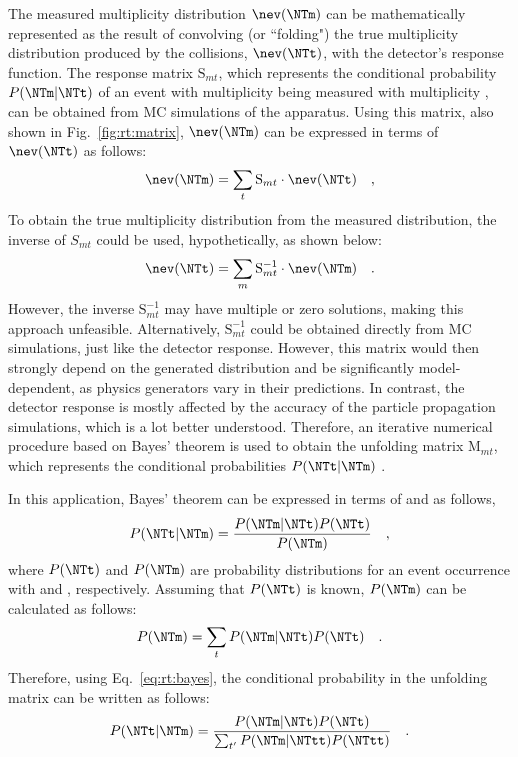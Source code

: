The measured multiplicity distribution $\nev(\NTm)$ can be mathematically represented as the result of convolving (or ``folding") the true multiplicity distribution produced by the collisions, $\nev(\NTt)$, with the detector's response function. The response matrix $\mathrm{S}_{mt}$, which represents the conditional probability $P(\NTm | \NTt)$ of an event with multiplicity \NTt being measured with multiplicity \NTm, can be obtained from MC simulations of the apparatus. Using this matrix, also shown in Fig.~\ref{fig:rt:matrix}, $\nev(\NTm)$ can be expressed in terms of $\nev(\NTt)$ as follows:
\begin{align}
\nev(\NTm) = \sum_t \mathrm{S}_{mt} \cdot \nev(\NTt) \quad ,
\end{align}
To obtain the true multiplicity distribution from the measured distribution, the inverse of $S_{mt}$ could be used, hypothetically, as shown below:
\begin{align}
\nev ( \NTt ) = \sum_m \mathrm{S}_{mt}^{-1} \cdot \nev ( \NTm ) \quad .
\end{align}
However, the inverse $\mathrm{S}_{mt}^{-1}$ may have multiple or zero solutions, making this approach unfeasible. Alternatively, $\mathrm{S}_{mt}^{-1}$ could be obtained directly from MC simulations, just like the detector response. However, this matrix would then strongly depend on the generated \NTt distribution and be significantly model-dependent, as physics generators vary in their \NTt predictions. In contrast, the detector response is mostly affected by the accuracy of the particle propagation simulations, which is a lot better understood. Therefore, an iterative numerical procedure based on Bayes' theorem is used to obtain the unfolding matrix $\mathrm{M}_{mt}$, which represents the conditional probabilities $P(\NTt | \NTm)$ \cite{dagostiniMultidimensionalUnfoldingMethod1995}.

In this application, Bayes' theorem can be expressed in terms of \NTm and \NTt as follows,
\begin{align}
\label{eq:rt:bayes}
P(\NTt | \NTm) = \dfrac{P(\NTm | \NTt)P(\NTt)}{P(\NTm)} \quad ,
\end{align}
where $P(\NTt)$ and $P(\NTm)$ are probability distributions for an event occurrence with \NTt and \NTm, respectively. Assuming that $P(\NTt)$ is known, $P(\NTm)$ can be calculated as follows:
\begin{align}
P(\NTm) = \sum_t P(\NTm | \NTt) P(\NTt) \quad .
\end{align}
Therefore, using Eq.~\ref{eq:rt:bayes}, the conditional probability in the unfolding matrix can be written as follows:
\begin{align}
P(\NTt | \NTm) = \dfrac{P(\NTm | \NTt)P(\NTt)}{\sum_{t'} P(\NTm | \NTtt) P(\NTtt)} \quad .
\end{align}

